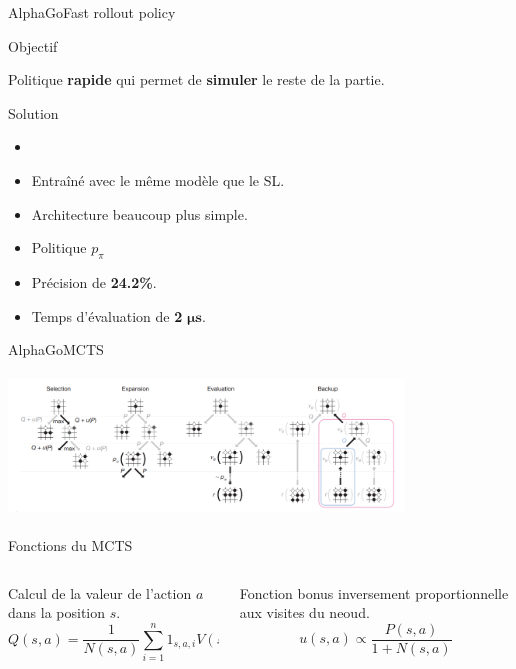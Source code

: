 \begin{frame}{AlphaGo}{Fast rollout policy}
    \begin{block}{Objectif}
        \begin{center}
            Politique \textbf{rapide} qui permet de \textbf{simuler} le reste de la partie.
        \end{center}
    \end{block}
    \begin{block}{Solution}
        \begin{itemize}
            \item
            \item Entraîné avec le même modèle que le SL.
            \item Architecture beaucoup plus simple.
            \item Politique $p_\pi$
            \item Précision de \textbf{24.2\%}.
            \item Temps d'évaluation de \textbf{2} $\boldsymbol{\mu s}$.
        \end{itemize}
    \end{block}
\end{frame}


\begin{frame}{AlphaGo}{MCTS}
    \begin{center}
        \includegraphics[width=10.5cm, height=3.8cm]{ressources/AlphaGo/MCTS_AlphaGo}
        \begin{block}{ Fonctions du MCTS }
            \begin{columns}[t]
                \begin{column}{0.45\textwidth}
                    Calcul de la valeur de l'action $a$ dans la position $s$.
                    $$Q(s,a) = \frac{1}{N(s,a)}\sum\limits_{i=1}^{n} 1_{s,a,i} V(s_L)$$

                \end{column}
                \begin{column}{0.45\textwidth}
                    Fonction bonus inversement proportionnelle aux visites du neoud.
                    $$u(s,a) \propto \frac{P(s,a)}{1+N(s,a)}$$
                \end{column}
            \end{columns}
        \end{block}
    \end{center}
\end{frame}

